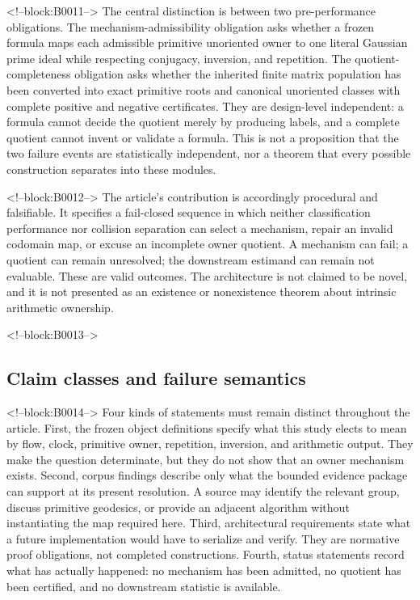 \documentclass[11pt,a4paper]{article}
\begin{document}
<!--block:B0011-->
The central distinction is between two pre-performance obligations. The mechanism-admissibility obligation asks whether a frozen formula maps each admissible primitive unoriented owner to one literal Gaussian prime ideal while respecting conjugacy, inversion, and repetition. The quotient-completeness obligation asks whether the inherited finite matrix population has been converted into exact primitive roots and canonical unoriented classes with complete positive and negative certificates. They are design-level independent: a formula cannot decide the quotient merely by producing labels, and a complete quotient cannot invent or validate a formula. This is not a proposition that the two failure events are statistically independent, nor a theorem that every possible construction separates into these modules.

<!--block:B0012-->
The article's contribution is accordingly procedural and falsifiable. It specifies a fail-closed sequence in which neither classification performance nor collision separation can select a mechanism, repair an invalid codomain map, or excuse an incomplete owner quotient. A mechanism can fail; a quotient can remain unresolved; the downstream estimand can remain not evaluable. These are valid outcomes. The architecture is not claimed to be novel, and it is not presented as an existence or nonexistence theorem about intrinsic arithmetic ownership.

<!--block:B0013-->
\subsection{Claim classes and failure semantics}

<!--block:B0014-->
Four kinds of statements must remain distinct throughout the article. First, the frozen object definitions specify what this study elects to mean by flow, clock, primitive owner, repetition, inversion, and arithmetic output. They make the question determinate, but they do not show that an owner mechanism exists. Second, corpus findings describe only what the bounded evidence package can support at its present resolution. A source may identify the relevant group, discuss primitive geodesics, or provide an adjacent algorithm without instantiating the map required here. Third, architectural requirements state what a future implementation would have to serialize and verify. They are normative proof obligations, not completed constructions. Fourth, status statements record what has actually happened: no mechanism has been admitted, no quotient has been certified, and no downstream statistic is available.
\end{document}
